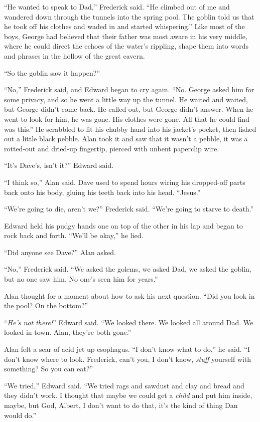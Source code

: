 \documentclass{article}
\begin{document}
``He wanted to speak to Dad,'' Frederick said.  ``He climbed out of me
and wandered down through the tunnels into the spring pool.  The
goblin told us that he took off his clothes and waded in and started
whispering.'' Like most of the boys, George had believed that their
father was most aware in his very middle, where he could direct the
echoes of the water's rippling, shape them into words and phrases in
the hollow of the great cavern.

``So the goblin saw it happen?''

``No,'' Frederick said, and Edward began to cry again.  ``No.  George
asked him for some privacy, and so he went a little way up the tunnel. 
He waited and waited, but George didn't come back.  He called out, but
George didn't answer.  When he went to look for him, he was gone.  His
clothes were gone.  All that he could find was this.'' He scrabbled to
fit his chubby hand into his jacket's pocket, then fished out a little
black pebble.  Alan took it and saw that it wasn't a pebble, it was a
rotted-out and dried-up fingertip, pierced with unbent paperclip wire.

``It's Dave's, isn't it?'' Edward said.

``I think so,'' Alan said.  Dave used to spend hours wiring his
dropped-off parts back onto his body, gluing his teeth back into his
head.  ``Jesus.''

``We're going to die, aren't we?'' Frederick said.  ``We're going to
starve to death.''

Edward held his pudgy hands one on top of the other in his lap and
began to rock back and forth.  ``We'll be okay,'' he lied.

``Did anyone see Dave?'' Alan asked.

``No,'' Frederick said.  ``We asked the golems, we asked Dad, we asked
the goblin, but no one saw him.  No one's seen him for years.''

Alan thought for a moment about how to ask his next question.  ``Did
you look in the pool?  On the bottom?''

``\textit{He's not there!}'' Edward said.  ``We looked there.  We
looked all around Dad.  We looked in town.  Alan, they're both gone.''

Alan felt a sear of acid jet up esophagus.  ``I don't know what to
do,'' he said.  ``I don't know where to look.  Frederick, can't you, I
don't know, \textit{stuff} yourself with something?  So you can eat?''

``We tried,'' Edward said.  ``We tried rags and sawdust and clay and
bread and they didn't work.  I thought that maybe we could get a
\textit{child} and put him inside, maybe, but God, Albert, I don't
want to do that, it's the kind of thing Dan would do.''
\end{document}
